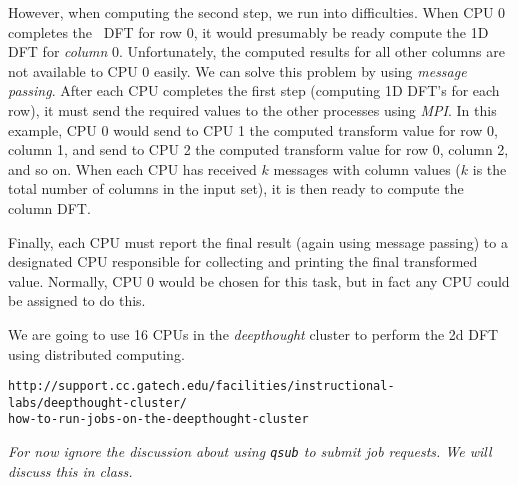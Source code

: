 \documentclass[10pt]{article}
\begin{document}
However, when computing the second step, we run into difficulties.  
When CPU 0 completes the \od\ DFT for row 0, it would presumably be ready
compute the 1D DFT for {\em column} 0.  Unfortunately, the computed results
for all other columns are not available to CPU 0 easily.  We can solve this
problem by using {\em message passing}.  After each CPU completes the 
first step (computing 1D DFT's for each row), it must send the required
values to the other processes using {\em MPI}.  In this example, CPU 0
would send to CPU 1 the computed transform value for row 0, column 1, and
send to CPU 2 the computed transform value for row 0, column 2, and so on.
When each CPU has received $k$ messages with column values ($k$ is the
total number of columns in the input set), it is then ready to compute
the column DFT.

Finally, each CPU must report the final result (again using message passing)
to a designated CPU responsible for collecting and printing the final
transformed value.  Normally, CPU 0 would be chosen for this task, but in 
fact any CPU could be assigned to do this.


We are going to use 16 CPUs in the {\em deepthought} cluster to perform
the 2d DFT using distributed computing.

{\tt http://support.cc.gatech.edu/facilities/instructional-labs/deepthought-cluster/ \\
      how-to-run-jobs-on-the-deepthought-cluster}

{\em For now ignore the discussion about using {\tt qsub} to submit job requests.
We will discuss this in class. }
\end{document}
